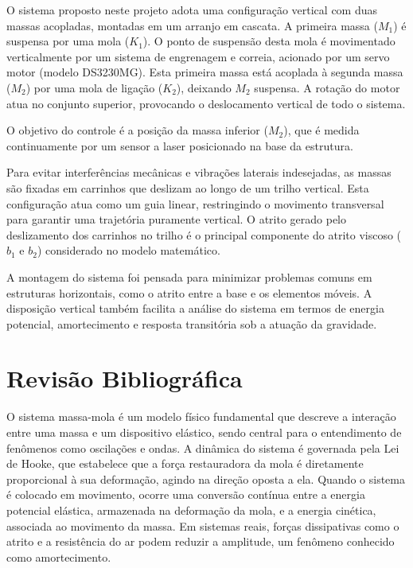 \documentclass[9pt,a4paper,twocolumn,twoside]{tau-class/tau}
\begin{document}
O sistema proposto neste projeto adota uma configuração vertical com duas massas acopladas, montadas em um arranjo em cascata. A primeira massa ($M_1$) é suspensa por uma mola ($K_1$). O ponto de suspensão desta mola é movimentado verticalmente por um sistema de engrenagem e correia, acionado por um servo motor (modelo DS3230MG). Esta primeira massa está acoplada à segunda massa ($M_2$) por uma mola de ligação ($K_2$), deixando $M_2$ suspensa. A rotação do motor atua no conjunto superior, provocando o deslocamento vertical de todo o sistema.

O objetivo do controle é a posição da massa inferior ($M_2$), que é medida continuamente por um sensor a laser posicionado na base da estrutura. 

Para evitar interferências mecânicas e vibrações laterais indesejadas, as massas são fixadas em carrinhos que deslizam ao longo de um trilho vertical. Esta configuração atua como um guia linear, restringindo o movimento transversal para garantir uma trajetória puramente vertical. O atrito gerado pelo deslizamento dos carrinhos no trilho é o principal componente do atrito viscoso ($b_1$ e $b_2$) considerado no modelo matemático.

A montagem do sistema foi pensada para minimizar problemas comuns em estruturas horizontais, como o atrito entre a base e os elementos móveis. A disposição vertical também facilita a análise do sistema em termos de energia potencial, amortecimento e resposta transitória sob a atuação da gravidade.


\section{Revisão Bibliográfica}

O sistema massa-mola é um modelo físico fundamental que descreve a interação entre uma massa e um dispositivo elástico, sendo central para o entendimento de fenômenos como oscilações e ondas. A dinâmica do sistema é governada pela Lei de Hooke, que estabelece que a força restauradora da mola é diretamente proporcional à sua deformação, agindo na direção oposta a ela. Quando o sistema é colocado em movimento, ocorre uma conversão contínua entre a energia potencial elástica, armazenada na deformação da mola, e a energia cinética, associada ao movimento da massa. Em sistemas reais, forças dissipativas como o atrito e a resistência do ar podem reduzir a amplitude, um fenômeno conhecido como amortecimento. \cite{SistemaMassaMola}
\end{document}
